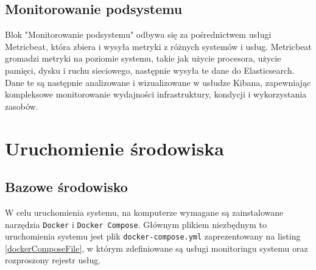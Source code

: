 \subsection{Monitorowanie podsystemu}

Blok "Monitorowanie podsystemu" odbywa się za pośrednictwem usługi Metricbeat, która zbiera i wysyła metryki z różnych systemów i usług. Metricbeat gromadzi metryki na poziomie systemu, takie jak użycie procesora, użycie pamięci, dysku i ruchu sieciowego, następnie wysyła te dane do Elasticsearch. Dane te są następnie analizowane i wizualizowane w usłudze Kibana, zapewniając kompleksowe monitorowanie wydajności infrastruktury, kondycji i wykorzystania zasobów.

\section{Uruchomienie środowiska}

\subsection{Bazowe środowisko}

W celu uruchomienia systemu, na komputerze wymagane są zainstalowane narzędzia \verb|Docker| i \verb|Docker Compose|. Głównym plikiem niezbędnym to uruchomienia systemu jest plik \verb|docker-compose.yml| zaprezentowany na listing \ref{dockerComposeFile}, w którym zdefiniowane są usługi monitoringu systemu oraz rozproszony rejestr usług.


